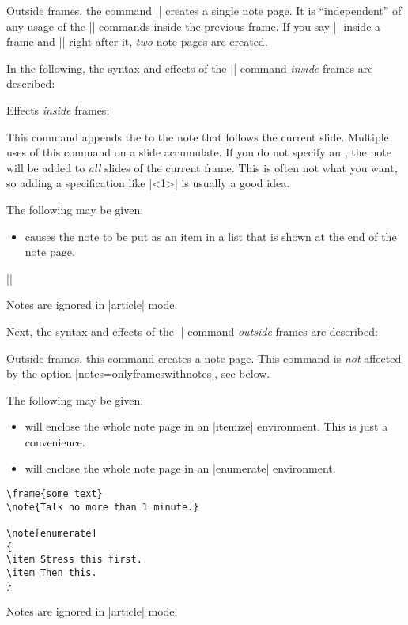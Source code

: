 Outside frames, the command |\note| creates a single note page. It is ``independent'' of any usage of the |\note| commands inside the previous frame. If you say |\note| inside a frame and |\note| right after it, \emph{two} note pages are created.

In the following, the syntax and effects of the |\note| command \emph{inside} frames are described:

\begin{command}{\note{}}
  Effects \emph{inside} frames:

  This command appends the  to the note that follows the current slide. Multiple uses of this command on a slide accumulate. If you do not specify an , the note will be added to \emph{all} slides of the current frame. This is often not what you want, so adding a specification like |<1>| is usually a good idea.

  The following  may be given:
  \begin{itemize}
  \item
     causes the note to be put as an item in a list that is shown at the end of the note page.
  \end{itemize}

  \example||

  \articlenote
  Notes are ignored in |article| mode.

\end{command}

Next, the syntax and effects of the |\note| command \emph{outside} frames are described:

\begin{command}{\note{}}
  Outside frames, this command creates a note page. This command is \emph{not} affected by the option |notes=onlyframeswithnotes|, see below.

  The following  may be given:
  \begin{itemize}
  \item
     will enclose the whole note page in an |itemize| environment. This is just a convenience.
  \item
     will enclose the whole note page in an |enumerate| environment.
  \end{itemize}

  \example
\begin{verbatim}
\frame{some text}
\note{Talk no more than 1 minute.}

\note[enumerate]
{
\item Stress this first.
\item Then this.
}
\end{verbatim}

  \articlenote
  Notes are ignored in |article| mode.
\end{command}

